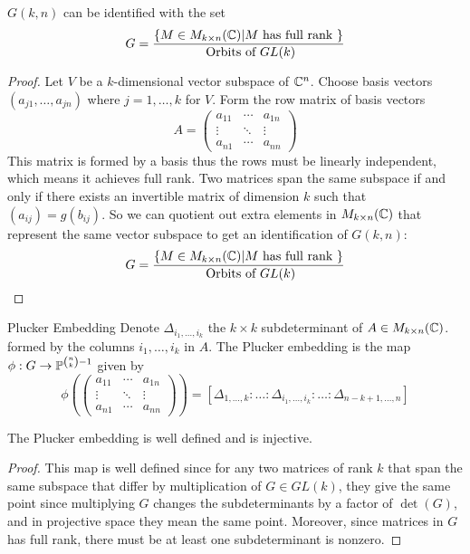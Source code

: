 \documentclass[a4paper]{article}
\begin{document}
\begin{lmm}{}{} $G(k,n)$ can be identified with the set $$G=\frac{\{M\in M_{k\times n}(\mathbb{C})|M\text{ has full rank }\}}{\text{ Orbits of }GL(k)}$$ \tcbline
\begin{proof}
Let $V$ be a $k$-dimensional vector subspace of $\mathbb{C}^n$. Choose basis vectors $(a_{j1},\dots,a_{jn})$ where $j=1,\dots,k$ for $V$. Form the row matrix of basis vectors $$A=\begin{pmatrix}a_{11} & \cdots & a_{1n}\\\vdots & \ddots & \vdots\\ a_{n1} & \cdots & a_{nn}\end{pmatrix}$$
This matrix is formed by a basis thus the rows must be linearly independent, which means it achieves full rank. Two matrices span the same subspace if and only if there exists an invertible matrix of dimension $k$ such that $(a_{ij})=g(b_{ij})$. So we can quotient out extra elements in $M_{k\times n}(\mathbb{C})$ that represent the same vector subspace to get an identification of $G(k,n)$: $$G=\frac{\{M\in M_{k\times n}(\mathbb{C})|M\text{ has full rank }\}}{\text{ Orbits of }GL(k)}$$ 
\end{proof}
\end{lmm}

\begin{defn}{Plucker Embedding}{} Denote $\Delta_{i_1,\dots,i_k}$ the $k\times k$ subdeterminant of $A\in M_{k\times n}(\mathbb{C})$. formed by the columns $i_1,\dots,i_k$ in $A$. The Plucker embedding is the map $\phi:G\to\mathbb{P}^{\binom{n}{k}-1}$ given by $$\phi\left(\begin{pmatrix}a_{11} & \cdots & a_{1n}\\\vdots & \ddots & \vdots\\ a_{n1} & \cdots & a_{nn}\end{pmatrix}\right)=[\Delta_{1,\dots,k}:\dots:\Delta_{i_1,\dots,i_k}:\dots:\Delta_{n-k+1,\dots,n}]$$ 
\end{defn}

\begin{prp}{}{} The Plucker embedding is well defined and is injective. \tcbline
\begin{proof}
This map is well defined since for any two matrices of rank $k$ that span the same subspace that differ by multiplication of $G\in GL(k)$, they give the same point since multiplying $G$ changes the subdeterminants by a factor of $\det(G)$, and in projective space they mean the same point. Moreover, since matrices in $G$ has full rank, there must be at least one subdeterminant is nonzero. 
\end{proof}
\end{prp}
\end{document}
